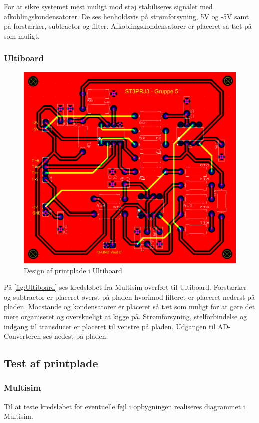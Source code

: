 \vspace{0.3 cm}

For at sikre systemet mest muligt mod støj stabiliseres signalet med afkoblingskondensatorer. De ses henholdsvis på strømforsyning, 5V og -5V samt på forstærker, subtractor og filter. Afkoblingskondensatorer er placeret så tæt på som muligt. 

\clearpage

\subsubsection{Ultiboard}
\vspace{0.5 cm}
\begin{figure}[h!]
	\centering
	\includegraphics[width=0.6\linewidth]{Hardware/Ultiboard}
	\caption{Design af printplade i Ultiboard}
	\label{fig:Ultiboard}
\end{figure}

\vspace{0.5 cm}

På \vref{fig:Ultiboard} ses kredsløbet fra Multisim overført til Ultiboard. Forstærker og subtractor er placeret øverst på pladen hvorimod filteret er placeret nederst på pladen. Mocstande og kondensatorer er placeret så tæt som muligt for at gøre det mere organiseret og overskueligt at kigge på. Strømforsyning, stelforbindelse og indgang til transducer er placeret til venstre på pladen. Udgangen til AD-Converteren ses nedest på pladen.

\clearpage
\subsection{Test af printplade}
\vspace{0.5 cm}
\subsubsection{Multisim}
Til at teste kredsløbet for eventuelle fejl i opbygningen realiseres diagrammet i Multisim. 

